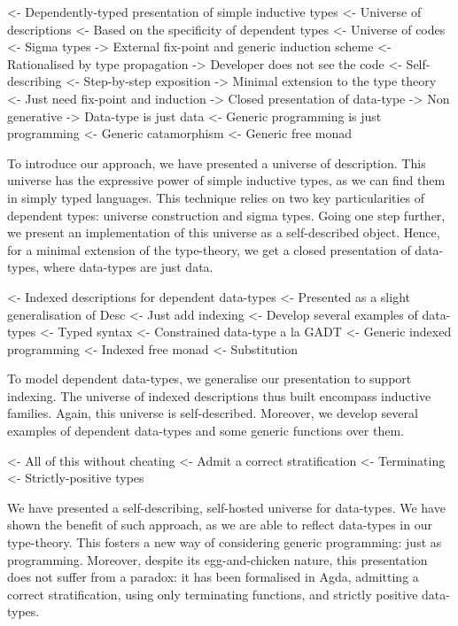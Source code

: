 \documentclass[preprint
              , authoryear
              ]{sigplanconf}
\newenvironment{wstructure}{\comment}{\endcomment}
\begin{document}
\begin{wstructure}
<- Dependently-typed presentation of simple inductive types
    <- Universe of descriptions
        <- Based on the specificity of dependent types
            <- Universe of codes
            <- Sigma types
        -> External fix-point and generic induction scheme
    <- Rationalised by type propagation
        -> Developer does not see the code
    <- Self-describing
        <- Step-by-step exposition
        -> Minimal extension to the type theory
            <- Just need fix-point and induction
        -> Closed presentation of data-type
            -> Non generative
        -> Data-type is just data
    <- Generic programming is just programming
        <- Generic catamorphism
        <- Generic free monad
\end{wstructure}

To introduce our approach, we have presented a universe of
description. This universe has the expressive power of simple
inductive types, as we can find them in simply typed languages. This
technique relies on two key particularities of dependent types:
universe construction and sigma types. Going one step further, we
present an implementation of this universe as a self-described
object. Hence, for a minimal extension of the type-theory, we get a
closed presentation of data-types, where data-types are just data.

\begin{wstructure}
<- Indexed descriptions for dependent data-types
    <- Presented as a slight generalisation of Desc
        <- Just add indexing
    <- Develop several examples of data-types
        <- Typed syntax
        <- Constrained data-type a la GADT
    <- Generic indexed programming
        <- Indexed free monad
        <- Substitution
\end{wstructure}

To model dependent data-types, we generalise our presentation to
support indexing. The universe of indexed descriptions thus built
encompass inductive families. Again, this universe is
self-described. Moreover, we develop several examples of dependent
data-types and some generic functions over them.

\begin{wstructure}
<- All of this without cheating
    <- Admit a correct stratification
    <- Terminating
    <- Strictly-positive types
\end{wstructure}

We have presented a self-describing, self-hosted universe for
data-types. We have shown the benefit of such approach, as we are able
to reflect data-types in our type-theory. This fosters a new way of
considering generic programming: just as programming. Moreover,
despite its egg-and-chicken nature, this presentation does not suffer
from a paradox: it has been formalised in Agda, admitting a correct
stratification, using only terminating functions, and strictly
positive data-types.
\end{document}
